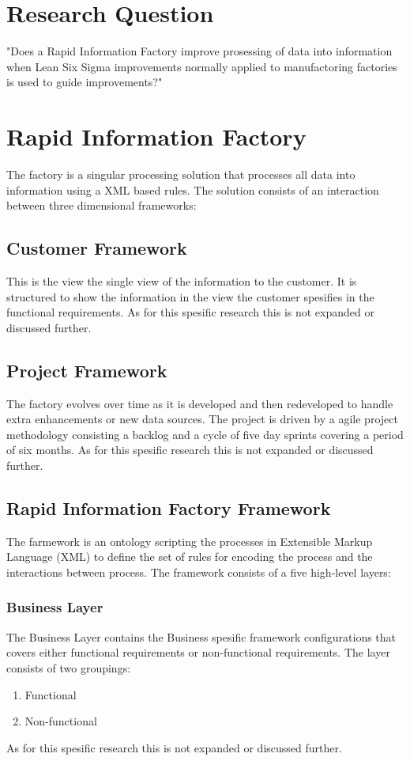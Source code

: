 \documentclass{sigplanconf}
\begin{document}
\section{Research Question}
"Does a Rapid Information Factory improve prosessing of data into information when Lean Six Sigma improvements normally applied to manufactoring factories is used to guide improvements?"
\section{Rapid Information Factory}
The factory is a singular processing solution that processes all data into information using a XML based rules. The solution consists of an interaction between three dimensional frameworks:
\subsection{Customer Framework}
This is the view the single view of the information to the customer. It is structured to show the information in the view the customer spesifies in the functional requirements. As for this spesific research this is not expanded or discussed further.
\subsection{Project Framework} 
The factory evolves over time as it is developed and then redeveloped to handle extra enhancements or new data sources. The project is driven by a agile project methodology consisting a backlog and a cycle of five day sprints covering a period of six months. As for this spesific research this is not expanded or discussed further.
\subsection{Rapid Information Factory Framework}
The farmework is an ontology scripting the processes in Extensible Markup Language (XML) to define the set of rules for encoding the process and the interactions between process. The framework consists of a five high-level layers:
\subsubsection{Business Layer}
The Business Layer contains the Business spesific framework configurations that covers either functional requirements or non-functional requirements. The layer consists of two groupings:
\begin{enumerate}
  \item Functional
  \item Non-functional
\end{enumerate}
As for this spesific research this is not expanded or discussed further.
\end{document}
